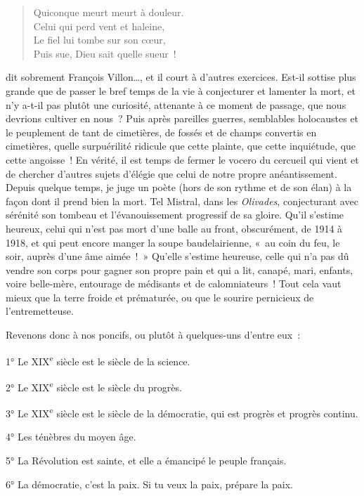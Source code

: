 \documentclass[french,twoside]{book} %
\begin{document}
\begin{verse}
Quiconque meurt meurt à douleur.\\
Celui qui perd vent et haleine,\\
Le fiel lui tombe sur son cœur,\\
Puis sue, Dieu sait quelle sueur !\\
\end{verse}

\noindent dit sobrement François Villon…, et il court à d’autres exercices. Est-il sottise plus grande que de passer le bref temps de la vie à conjecturer et lamenter la mort, et n’y a-t-il pas plutôt une curiosité, attenante à ce moment de passage, que nous devrions cultiver en nous ? Puis après pareilles guerres, semblables holocaustes et le peuplement de tant de cimetières, de fossés et de champs convertis en cimetières, quelle surpuérilité ridicule que cette plainte, que cette inquiétude, que cette angoisse ! En vérité, il est temps de fermer le vocero du cercueil qui vient et de chercher d’autres sujets d’élégie que celui de notre propre anéantissement. Depuis quelque temps, je juge un poète (hors de son rythme et de son élan) à la façon dont il prend bien la mort. Tel Mistral, dans les {\itshape Olivades}, conjecturant avec sérénité son tombeau et l’évanouissement progressif de sa gloire. Qu’il s’estime heureux, celui qui n’est pas mort d’une balle au front, obscurément, de 1914 à 1918, et qui peut encore manger la soupe baudelairienne, « au coin du feu, le soir, auprès d’une âme aimée ! » Qu’elle s’estime heureuse, celle qui n’a pas dû vendre son corps pour gagner son propre pain et qui a lit, canapé, mari, enfants, voire belle-mère, entourage de médisants et de calomniateurs ! Tout cela vaut mieux que la terre froide et prématurée, ou que le sourire pernicieux de l’entremetteuse.\par
Revenons donc à nos poncifs, ou plutôt à quelques-uns d’entre eux :\par
1° Le XIX\textsuperscript{e} siècle est le siècle de la science.\par
2° Le XIX\textsuperscript{e} siècle est le siècle du progrès.\par
3° Le XIX\textsuperscript{e} siècle est le siècle de la démocratie, qui est progrès et progrès continu.\par
4° Les ténèbres du moyen âge.\par
5° La Révolution est sainte, et elle a émancipé le peuple français.\par
6° La démocratie, c’est la paix. Si tu veux la paix, prépare la paix.\par
\end{document}
